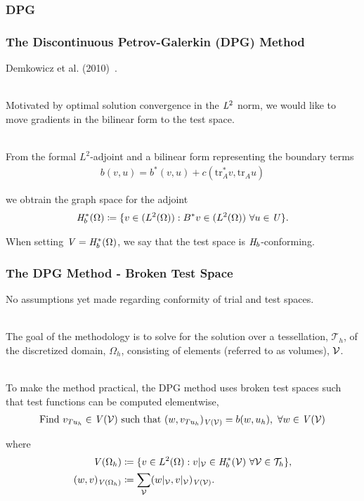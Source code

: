 \subsubsection{DPG}

\begin{frame}
\frametitle{The Discontinuous Petrov-Galerkin (DPG) Method}

Demkowicz et al. (2010)~\cite{Demkowicz2011}.
\\~

Motivated by optimal solution convergence in the $\mathit{{{L}}}^2$ norm, we would like
to move gradients in the bilinear form to the test space.
\\~

From the formal $L^2$-adjoint and a bilinear form representing the boundary terms
\begin{align}
b(v,u) = b^*(v,u) + c(\text{tr}_A^* v, \text{tr}_A u)
\end{align}

we obtrain the graph space for the adjoint
\begin{align}
\mathit{{{H}}}_b^*(\Omega) \coloneqq
\{ v \in (L^2(\Omega)) : B^*v \in (L^2(\Omega))\ \forall u \in \mathit{{{U}}} \}.
\end{align}

When setting $\mathit{{{V}}} = \mathit{{{H}}}_b^*(\Omega)$, we say that the test space
is $\mathit{{{H}}}_b$-conforming.

\end{frame}

\begin{frame}
\frametitle{The DPG Method - Broken Test Space}

No assumptions yet made regarding conformity of trial and test spaces.
\\~

The goal of the methodology is to solve for the solution over a tessellation,
$\mathcal{T}_h$, of the discretized domain, $\Omega_h$, consisting of elements
(referred to as volumes), $\mathcal{{{V}}}$.
\\~

To make the method practical, the DPG method uses broken test spaces such that
test functions can be computed elementwise,
\begin{align} \label{eq:auxiliary_opt_v_infinite}
\text{Find}\ v_{T u_h} \in \mathit{{{V}}}(\mathcal{{{V}}})\ \text{such that}\
(w,v_{T u_h})_{\mathit{{{V}}}(\mathcal{{{V}}})} = b(w,u_h),\ \forall w \in \mathit{{{V}}}(\mathcal{{{V}}})
\end{align}

where
\begin{align}
\mathit{{{V}}}(\Omega_h)
&\coloneqq
\{ v \in L^2(\Omega) : v|_{\mathcal{{{V}}}} \in \mathit{{{H}}}_b^*(\mathcal{{{V}}})\
   \forall \mathcal{{{V}}} \in \mathcal{T}_h \}, \\
(w,v)_{\mathit{{{V}}}(\Omega_h)}
&\coloneqq
\sum_{\mathcal{{{V}}}} (w|_{\mathcal{{{V}}}},v|_{\mathcal{{{V}}}})_{\mathit{{{V}}}(\mathcal{{{V}}})}.
\end{align}

\end{frame}


